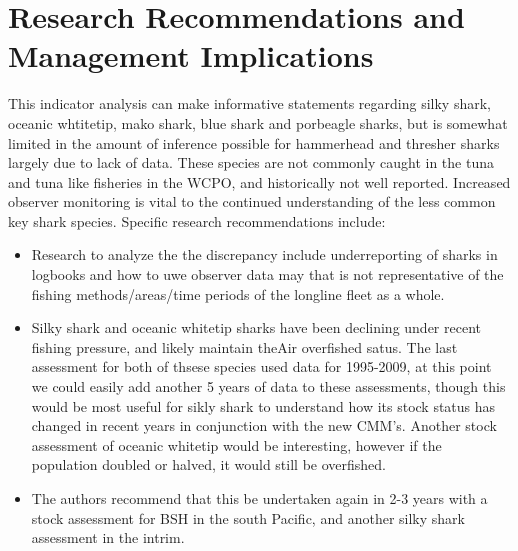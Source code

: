\documentclass[12pt]{SCreport}
\begin{document}


%           
%           


\section{  Research Recommendations and Management Implications}

This indicator analysis can make informative statements regarding silky shark, oceanic whtitetip, mako shark,  blue shark and porbeagle sharks, but is somewhat limited in the amount of inference possible for hammerhead and thresher sharks largely due to lack of data. 
 These species are not commonly caught in the tuna and tuna like fisheries in the WCPO, and historically not well reported.  
 Increased observer monitoring is vital to the continued understanding of the less common key shark species.  
 Specific research recommendations include:
 
 \begin{itemize}
 \item Research to analyze the the  discrepancy include underreporting of sharks in logbooks and how to uwe   observer data may  that is not representative of the fishing methods/areas/time periods of the longline fleet as a whole.  
\item Silky shark and oceanic whitetip sharks have been declining under recent fishing pressure, and likely maintain theAir overfished satus. 
 The last assessment for both of thsese species used data for 1995-2009, at this point we could easily add another 5 years of data to these assessments, though this would be most useful for sikly shark to understand how its stock status has changed in recent years in conjunction with the new CMM's. Another stock assessment of oceanic whitetip would be interesting, however if the population doubled or halved, it would still be overfished.

\item The authors recommend that this be undertaken again in 2-3 years with a stock assessment for BSH in the south Pacific, and another silky shark assessment in the intrim. 




\end{itemize}
\end{document}
